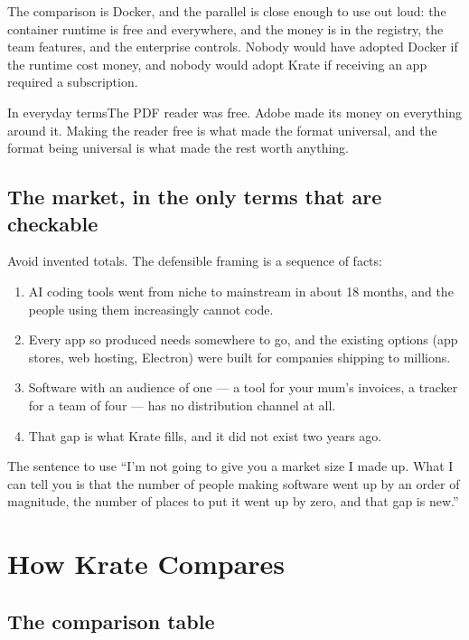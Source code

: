 \documentclass[11pt,a4paper]{report}
\newcommand{\analogy}[1]{\begin{plainbox}{In everyday terms}#1\end{plainbox}}
\begin{document}
The comparison is Docker, and the parallel is close enough to use out loud:
the container runtime is free and everywhere, and the money is in the
registry, the team features, and the enterprise controls. Nobody would have
adopted Docker if the runtime cost money, and nobody would adopt Krate if
receiving an app required a subscription.

\analogy{The PDF reader was free. Adobe made its money on everything around
it. Making the reader free is what made the format universal, and the format
being universal is what made the rest worth anything.}

\section{The market, in the only terms that are checkable}

Avoid invented totals. The defensible framing is a sequence of facts:

\begin{enumerate}[leftmargin=*]
  \item AI coding tools went from niche to mainstream in about 18 months,
    and the people using them increasingly cannot code.
  \item Every app so produced needs somewhere to go, and the existing
    options (app stores, web hosting, Electron) were built for companies
    shipping to millions.
  \item Software with an audience of one --- a tool for your mum's invoices,
    a tracker for a team of four --- has no distribution channel at all.
  \item That gap is what Krate fills, and it did not exist two years ago.
\end{enumerate}

\begin{plainbox}{The sentence to use}
``I'm not going to give you a market size I made up. What I can tell you is
that the number of people making software went up by an order of magnitude,
the number of places to put it went up by zero, and that gap is new.''
\end{plainbox}

\chapter{How Krate Compares}

\section{The comparison table}
\end{document}
